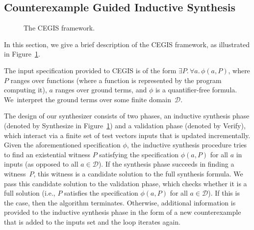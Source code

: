 \documentclass[twocolumn]{autart}    %
\begin{document}
\subsection{Counterexample Guided Inductive Synthesis} 
\label{ssec:cegis}

\begin{figure}
\centering
{}
 \caption{The CEGIS framework. \label{fig:CEGIS}}
\end{figure}

In this section, we give a brief description of the CEGIS framework, as illustrated in Figure~\ref{fig:CEGIS}. 

The input specification provided to CEGIS is of the form
$\exists P .\, \forall a.\, \phi(a, P)$, where $P$ ranges over functions
(where a function is represented by the program computing it),
$a$ ranges over ground terms, and $\phi$ is a quantifier-free formula. 
We~interpret the ground terms over some finite domain~$\mathcal{D}$.
%

The design of our synthesizer consists of two phases, an inductive
synthesis phase (denoted by {\sc Synthesize} in
Figure~\ref{fig:CEGIS}) and a validation phase (denoted by {\sc
  Verify}), which interact via a finite set of test vectors {\sc
  inputs} that is updated incrementally.  Given the aforementioned
specification $\phi$, the inductive synthesis procedure tries to
find an existential witness $P$ satisfying the specification
$\phi(a, P)$ for all $a$ in {\sc inputs} (as opposed to all $a \in
\mathcal{D}$).
%
If the synthesis phase succeeds in finding a witness~$P$, this witness is a
candidate solution to the full synthesis formula.  We pass this candidate
solution to the validation phase, which checks whether it is a full solution
(i.e., $P$ satisfies the specification $\phi(a, P)$ for all
$a\in\mathcal{D}$).  If this is the case, then the algorithm terminates. 
Otherwise, additional information is provided to the inductive synthesis
phase in the form of a new counterexample that is added to the {\sc inputs}
set and the loop iterates again.  %
\end{document}

